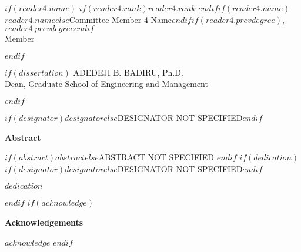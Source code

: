 \documentclass[12pt,letterpaper,toc=flat,oneside]{report}
\begin{document}
\begin{center}
  $if(reader4.name)$
  \begingroup
  \singlespace
    $if(reader4.rank)$$reader4.rank$ $endif$$if(reader4.name)$$reader4.name$$else$Committee Member 4 Name$endif$$if(reader4.prevdegree)$, $reader4.prevdegree$$endif$\\ 
    Member
    \par
  \endgroup
  \bigskip\bigskip
  $endif$
  
  $if(dissertation)$
  \bigskip
  \begingroup
  \singlespace
    ADEDEJI B. BADIRU, Ph.D.\\ 
    Dean, Graduate School of Engineering and Management
    \par
  \endgroup
  $endif$
	\end{center}
	\vfill
	\newpage
	\setcounter{page}{4}
	\renewcommand{\thepage}{\roman{page}}
    \thispagestyle{plain}
    \noindent $if(designator)$$designator$$else$DESIGNATOR NOT SPECIFIED$endif$
    \begin{center}
	\Large\bfseries Abstract
    \end{center}
    \vspace{2em}
    $if(abstract)$$abstract$$else$ABSTRACT NOT SPECIFIED
    $endif$
    \newpage
$if(dedication)$
       \noindent 
       $if(designator)$$designator$$else$DESIGNATOR NOT SPECIFIED$endif$
       \vfill
       \begin{center}
	   \em{$dedication$}
	   \end{center}
	   \vfill
      \newpage
$endif$
$if(acknowledge)$
\thispagestyle{plain}
    \begin{center}
	\Large\bfseries Acknowledgements
    \end{center}
    \vspace{3em}
    $acknowledge$
 \newpage
$endif$
\end{document}
